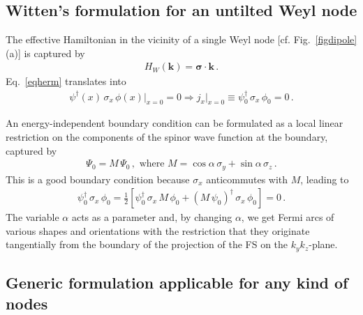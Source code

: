 \documentclass[aps,prb,onecolumn, footinbib, 10pt]{revtex4-2}
\begin{document}
\subsection{Witten's formulation for an untilted Weyl node}
\label{secwit}

The effective Hamiltonian in the vicinity of a single Weyl node [cf. Fig.~\ref{figdipole}(a)] is captured by
\begin{align}
\label{eqweyl}
H_W (\mathbf k) = \boldsymbol{\sigma} \cdot {\mathbf k}\,.
\end{align}
Eq.~\eqref{eqherm} translates into
\begin{align}
\label{eqjxweyl}
\psi^\dagger (x)\, \sigma_x \, \phi (x) \vert_{x=0} = 0
\Rightarrow j_x\vert_{x=0} \equiv \psi_0^\dagger\, \sigma_x \, \phi_0  = 0\,.
\end{align}

An energy-independent
boundary condition can be formulated as a local linear restriction on the components of the spinor wave function at the boundary, captured by \cite{witten}
\begin{align}
\label{eqalpha}
\Psi_0 =  M \, \Psi_0\,, \text{ where } M = \cos \alpha \, \sigma_y + \sin  \alpha \, \sigma_z \,.
\end{align}
This is a good boundary condition because $\sigma_x $ anticommutes with $M$, leading to
\begin{align}
 \psi_0^\dagger\, \sigma_x \, \phi_0 = 
 \frac{1}{2} \left[ \psi_0^\dagger\, \sigma_x \,M\, \phi_0 
 + ( M\, \psi_0)^\dagger\, \sigma_x \, \phi_0 \right ]
  = 0\,.
\end{align}
The variable $\alpha $ acts as a parameter and, by changing $\alpha$, we get Fermi arcs of various shapes and orientations with the restriction that they originate tangentially from the boundary of the projection of the FS on the $k_y k_z$-plane.


\subsection{Generic formulation applicable for any kind of nodes}
\label{secgen_method}
\end{document}
